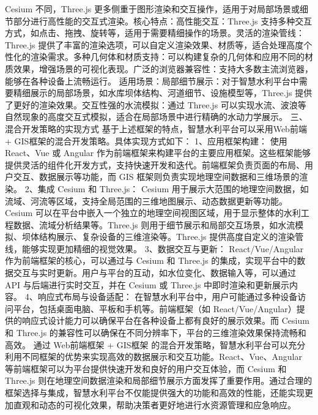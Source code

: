 {Cesium 不同，Three.js 更多侧重于图形渲染和交互操作，适用于对局部场景或细节部分进行高性能的交互式渲染。核心特点：高性能交互：Three.js
支持多种交互方式，如点击、拖拽、旋转等，适用于需要精细操作的场景。灵活的渲染管线：Three.js
提供了丰富的渲染选项，可以自定义渲染效果、材质等，适合处理高度个性化的渲染需求。多种几何体和材质支持：可以构建复杂的几何体和应用不同的材质效果，增强场景的可视化表现。广泛的浏览器兼容性：支持大多数主流浏览器，能够在各种设备上流畅运行。
适用场景：局部细节展示：对于智慧水利平台中需要精细展示的局部场景，如水库坝体结构、河道细节、设施模型等，Three.js 提供了更好的渲染效果。交互性强的水流模拟：通过 Three.js
可以实现水流、波浪等自然现象的高度交互式模拟，适合在局部场景中进行精确的水动力学展示。 三、混合开发策略的实现方式 基于上述框架的特点，智慧水利平台可以采用Web前端 + GIS框架的混合开发策略。具体实现方式如下： 1、应用框架构建：
使用 React、Vue 或 Angular 作为前端框架来构建平台的主要应用框架。这些框架能够提供灵活的组件化开发方式，支持快速开发和迭代。前端框架负责页面的布局、用户交互、数据展示等功能，而 GIS
框架则负责实现地理空间数据和三维场景的渲染。 2、集成 Cesium 和 Three.js： Cesium 用于展示大范围的地理空间数据，如流域、河流等区域，支持全局范围的三维地图展示、动态数据更新等功能。Cesium
可以在平台中嵌入一个独立的地理空间视图区域，用于显示整体的水利工程数据、流域分析结果等。Three.js 则用于细节展示和局部交互场景，如水流模拟、坝体结构展示、复杂设备的三维渲染等。Three.js
提供高度自定义的渲染管线，能够实现更加精细的视觉效果。 3、数据交互与更新： React/Vue/Angular 作为前端框架的核心，可以通过与 Cesium 和 Three.js
的集成，实现平台中的数据交互与实时更新。用户与平台的互动，如水位变化、数据输入等，可以通过 API 与后端进行实时交互，并在 Cesium 或 Three.js 中即时渲染和更新展示内容。 4、响应式布局与设备适配：
在智慧水利平台中，用户可能通过多种设备访问平台，包括桌面电脑、平板和手机等。前端框架（如 React/Vue/Angular）提供的响应式设计能力可以确保平台在各种设备上都有良好的展示效果。而 Cesium 和 Three.js
的兼容性可以确保在不同分辨率下，平台的三维渲染效果保持流畅和高效。 通过 Web前端框架 + GIS框架 的混合开发策略，智慧水利平台可以充分利用不同框架的优势来实现高效的数据展示和交互功能。React、Vue、Angular
等前端框架可以为平台提供快速开发和良好的用户交互体验，而 Cesium 和 Three.js
则在地理空间数据渲染和局部细节展示方面发挥了重要作用。通过合理的框架选择与集成，智慧水利平台不仅能提供强大的功能和高效的性能，还能实现更加直观和动态的可视化效果，帮助决策者更好地进行水资源管理和应急响应。
}
